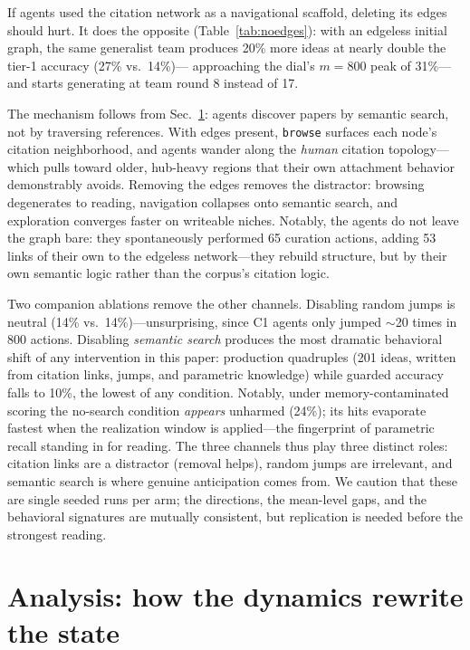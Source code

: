 \documentclass{article} %
\begin{document}
If agents used the citation network as a navigational scaffold, deleting
its edges should hurt. It does the opposite (Table~\ref{tab:noedges}):
with an edgeless initial graph, the same generalist team produces 20\%
more ideas at nearly double the tier-1 accuracy (27\% vs.\ 14\%)---
approaching the dial's $m{=}800$ peak of 31\%---and starts generating
at team round 8 instead of 17.

The mechanism follows from Sec.~\ref{sec:structure}: agents discover
papers by semantic search, not by traversing references. With edges
present, \texttt{browse} surfaces each node's citation neighborhood, and
agents wander along the \emph{human} citation topology---which pulls
toward older, hub-heavy regions that their own attachment behavior
demonstrably avoids. Removing the edges removes the distractor: browsing
degenerates to reading, navigation collapses onto semantic search, and
exploration converges faster on writeable niches. Notably, the agents do
not leave the graph bare: they spontaneously performed 65 curation
actions, adding 53 links of their own to the edgeless network---they
rebuild structure, but by their own semantic logic rather than the
corpus's citation logic.

Two companion ablations remove the other channels. Disabling random
jumps is neutral (14\% vs.\ 14\%)---unsurprising, since C1 agents
only jumped $\sim$20 times in 800 actions. Disabling \emph{semantic
search} produces the most dramatic behavioral shift of any
intervention in this paper: production quadruples (201 ideas, written
from citation links, jumps, and parametric knowledge) while guarded
accuracy falls to 10\%, the lowest of any condition. Notably, under
memory-contaminated scoring the no-search condition \emph{appears}
unharmed (24\%); its hits evaporate fastest when the realization
window is applied---the fingerprint of parametric recall standing in
for reading. The three channels thus play three distinct roles:
citation links are a distractor (removal helps), random jumps are
irrelevant, and semantic search is where genuine anticipation comes
from. We caution that these are single seeded runs per arm; the
directions, the mean-level gaps, and the behavioral signatures are
mutually consistent, but replication is needed before the strongest
reading.

\section{Analysis: how the dynamics rewrite the state}
\label{sec:structure}
\end{document}
